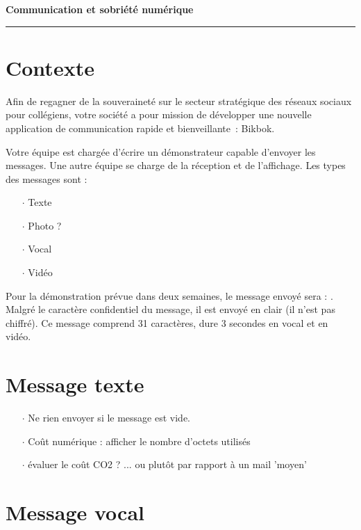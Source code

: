 \documentclass[a4paper]{article}
\begin{document}
\begin{center}
  \Large\bf Communication et sobriété numérique
\end{center}

\noindent\rule{\linewidth}{.6pt}

\section*{Contexte}

Afin de regagner de la souveraineté sur le secteur stratégique des réseaux sociaux pour collégiens, votre société a pour mission de développer une nouvelle application de communication rapide et bienveillante~: Bikbok.

Votre équipe est chargée d'écrire un démonstrateur capable d'envoyer les messages. Une autre équipe se charge de la réception et de l'affichage. Les types des messages sont :

\begin{itemize}[itemsep=0.2ex]
\item[$\cdot$] Texte
\item[$\cdot$] Photo ?
\item[$\cdot$] Vocal
\item[$\cdot$] Vidéo
\end{itemize}

Pour la démonstration prévue dans deux semaines, le message envoyé sera : . Malgré le caractère confidentiel du message, il  est envoyé en clair (il n'est pas chiffré). Ce message comprend 31 caractères, dure 3 secondes en vocal et en vidéo.

\section{Message texte}



\begin{itemize}[itemsep=0.2ex]
\item[$\cdot$] Ne rien envoyer si le message est vide.
\item[$\cdot$] Coût numérique : afficher le nombre d'octets utilisés
\item[$\cdot$] évaluer le coût CO2 ? ... ou plutôt par rapport à un mail  'moyen'
\end{itemize}

\section{Message vocal}
\end{document}
